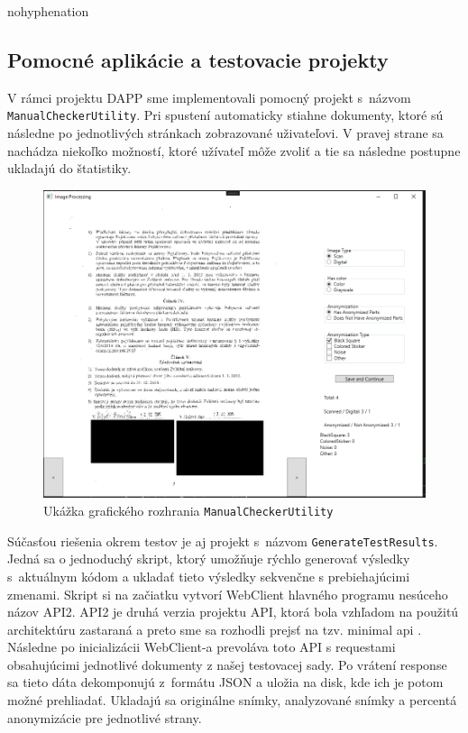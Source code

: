 \begin{hyphenrules}{nohyphenation}
\subsection{Pomocné aplikácie a testovacie projekty}
\label{chap:6.3.1}
V rámci projektu DAPP\cite{lukassalak} sme implementovali pomocný projekt s~názvom \texttt{ManualCheckerUtility}. Pri spustení automaticky stiahne dokumenty, ktoré sú následne po jednotlivých stránkach zobrazované uživateľovi. V pravej strane sa nachádza niekoľko možností, ktoré užívateľ môže zvoliť a tie sa následne postupne ukladajú do štatistiky. 

\begin{figure}[H]
    \centering
    \includegraphics[width=0.9\linewidth]{img/image_proc.png}
    \caption{Ukážka grafického rozhrania \texttt{ManualCheckerUtility}}
    \label{fig:6.2}
\end{figure}

Súčasťou riešenia okrem testov je aj projekt s~názvom \texttt{GenerateTestResults}. Jedná sa o jednoduchý skript, ktorý umožňuje rýchlo generovať výsledky s~aktuálnym kódom a ukladať tieto výsledky sekvenčne s prebiehajúcimi zmenami. 
Skript si na začiatku vytvorí WebClient hlavného programu nesúceho názov API2. API2 je druhá verzia projektu API, ktorá bola vzhľadom na použitú architektúru zastaraná a preto sme sa rozhodli prejsť na tzv. minimal api \cite{aspnetcore}. Následne po inicializácii WebClient-a prevoláva toto API s requestami obsahujúcimi jednotlivé dokumenty z našej testovacej sady. Po vrátení response sa tieto dáta dekomponujú z~formátu JSON a uložia na disk, kde ich je potom možné prehliadať. Ukladajú sa originálne snímky, analyzované snímky a percentá anonymizácie pre jednotlivé strany.


\end{hyphenrules}
